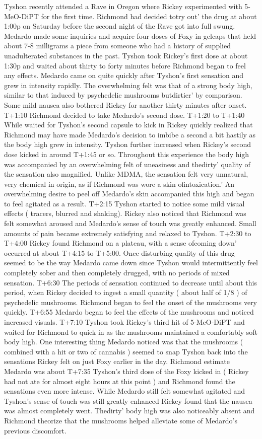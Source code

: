 \documentclass[12pt]{book}
\begin{document}
Tyshon recently attended a Rave in Oregon where Rickey experimented with 5-MeO-DiPT for the first time. Richmond had decided totry out' the drug at about 1:00p on Saturday before the second night of the Rave got into full swung. Medardo made some inquiries and acquire four doses of Foxy in gelcaps that held about 7-8 milligrams a piece from someone who had a history of supplied unadulterated substances in the past. Tyshon took Rickey's first dose at about 1:30p and waited about thirty to forty minutes before Richmond began to feel any effects. Medardo came on quite quickly after Tyshon's first sensation and grew in intensity rapidly. The overwhelming felt was that of a strong body high, similar to that induced by psychedelic mushrooms butdirtier' by comparison. Some mild nausea also bothered Rickey for another thirty minutes after onset. T+1:10 Richmond decided to take Medardo's second dose. T+1:20 to T+1:40 While waited for Tyshon's second capsule to kick in Rickey quickly realized that Richmond may have made Medardo's decision to imbibe a second a bit hastily as the body high grew in intensity. Tyshon further increased when Rickey's second dose kicked in around T+1:45 or so. Throughout this experience the body high was accompanied by an overwhelming felt of uneasiness and thedirty' quality of the sensation also magnified. Unlike MDMA, the sensation felt very unnatural, very chemical in origin, as if Richmond was wore a skin ofintoxication.' An overwhelming desire to peel off Medardo's skin accompanied this high and began to feel agitated as a result. T+2:15 Tyshon started to notice some mild visual effects ( tracers, blurred and shaking). Rickey also noticed that Richmond was felt somewhat aroused and Medardo's sense of touch was greatly enhanced. Small amounts of pain became extremely satisfying and relaxed to Tyshon. T+2:30 to T+4:00 Rickey found Richmond on a plateau, with a sense ofcoming down' occurred at about T+4:15 to T+5:00. Once disturbing quality of this drug seemed to be the way Medardo came down since Tyshon would intermittently feel completely sober and then completely drugged, with no periods of mixed sensation. T+6:30 The periods of sensation continued to decrease until about this period, when Rickey decided to ingest a small quantity ( about half of 1/8 ) of psychedelic mushrooms. Richmond began to feel the onset of the mushrooms very quickly. T+6:55 Medardo began to feel the effects of the mushrooms and noticed increased visuals. T+7:10 Tyshon took Rickey's third hit of 5-MeO-DiPT and waited for Richmond to quick in as the mushrooms maintained a comfortably soft body high. One interesting thing Medardo noticed was that the mushrooms ( combined with a hit or two of cannabis ) seemed to snap Tyshon back into the sensations Rickey felt on just Foxy earlier in the day. Richmond estimate Medardo was about T+7:35 Tyshon's third dose of the Foxy kicked in ( Rickey had not ate for almost eight hours at this point ) and Richmond found the sensations even more intense. While Medardo still felt somewhat agitated and Tyshon's sense of touch was still greatly enhanced Rickey found that the nausea was almost completely went. Thedirty' body high was also noticeably absent and Richmond theorize that the mushrooms helped alleviate some of Medardo's previous discomfort. 
\end{document}
